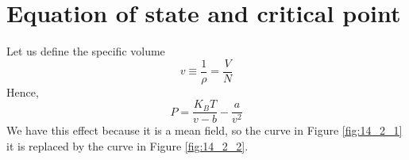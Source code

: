 \documentclass[../main/main.tex]{subfiles}
\begin{document}
\section{Equation of state and critical point}
Let us define the specific volume
\begin{equation}
  v \equiv \frac{1}{\rho } = \frac{V}{N}
\end{equation}
Hence,
\begin{equation}
P = \frac{K_B T}{v - b} - \frac{a}{v^2}
\end{equation}
We have this effect because it is a mean field, so the curve in Figure \ref{fig:14_2_1} it is replaced by the curve in Figure \ref{fig:14_2_2}.
\begin{figure}[h!]
\begin{minipage}[c]{0.5\linewidth}
\end{minipage}
\begin{minipage}[]{0.5\linewidth}
\centering
{}
\end{minipage}
\caption{\label{fig:} }
\end{figure}
\end{document}
